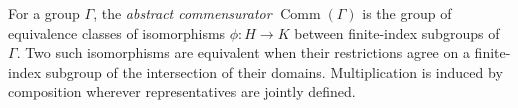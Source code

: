 
For a group $\Gamma$, the \emph{abstract commensurator} $\operatorname{Comm}(\Gamma)$ is the group of equivalence classes of isomorphisms $\phi:H\to K$ between finite-index subgroups of $\Gamma$. Two such isomorphisms are equivalent when their restrictions agree on a finite-index subgroup of the intersection of their domains. Multiplication is induced by composition wherever representatives are jointly defined.
